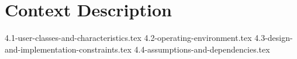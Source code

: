 \section{Context Description}

{4.1-user-classes-and-characteristics.tex}
{4.2-operating-environment.tex}
{4.3-design-and-implementation-constraints.tex}
{4.4-assumptions-and-dependencies.tex}
